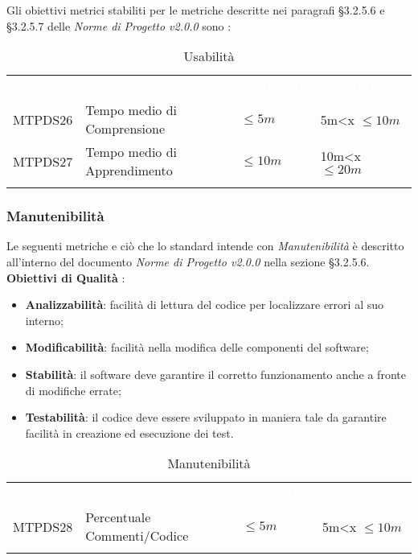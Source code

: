 Gli obiettivi metrici stabiliti per le metriche descritte nei paragrafi §3.2.5.6 e §3.2.5.7 delle \textit{Norme di Progetto v2.0.0} sono : 

\begin{longtable}{|C{.15\textwidth}|C{.24\textwidth}|C{.24\textwidth}|C{.24\textwidth}|}
\hline
{}\textbf{\textcolor{white}{ID}} & \textbf{\textcolor{white}{Nome}} & \textbf{\textcolor{white}{Ottimalità}} & \textbf{\textcolor{white}{Accettabilità}}\\
MTPDS26 & Tempo medio di Comprensione & $\leq 5m$ & 5m<x $\leq 10m$\\
\hline
{}MTPDS27 & Tempo medio di Apprendimento & $\leq 10m$ & 10m<x $\leq 20m$ \\ 
\hline
\caption{Usabilità}
\label{Usabilità}
\end{longtable}

\subsubsection{Manutenibilità}

Le seguenti metriche e ciò che lo standard intende con \textit{Manutenibilità} è descritto all'interno del documento \textit{Norme di Progetto v2.0.0} nella sezione §3.2.5.6. \\

\textbf{Obiettivi di Qualità} :

\begin{itemize}
	\item \textbf{Analizzabilità}: facilità di lettura del codice per localizzare errori al suo interno; 
	\item \textbf{Modificabilità}: facilità nella modifica delle componenti del software;
	\item \textbf{Stabilità}: il software deve garantire il corretto funzionamento anche a fronte di modifiche errate;
	\item \textbf{Testabilità}: il codice deve essere sviluppato in maniera tale da garantire facilità in creazione ed esecuzione dei test.
\end{itemize}

\begin{longtable}{|C{.15\textwidth}|C{.24\textwidth}|C{.24\textwidth}|C{.24\textwidth}|}
\hline
{}\textbf{\textcolor{white}{ID}} & \textbf{\textcolor{white}{Nome}} & \textbf{\textcolor{white}{Ottimalità}} & \textbf{\textcolor{white}{Accettabilità}}\\
MTPDS28 & Percentuale Commenti/Codice & $\leq 5m$ & 5m<x $\leq 10m$\\
\hline

\caption{Manutenibilità}
\label{Manutenibilità}
\end{longtable}

